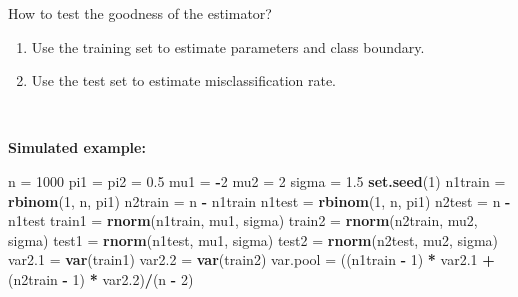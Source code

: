 \documentclass[
  10pt,
  ignorenonframetext,
]{beamer}
\newenvironment{Shaded}{\begin{snugshade}}{\end{snugshade}}
\newcommand{\DecValTok}[1]{\textcolor[rgb]{0.00,0.00,0.81}{#1}}
\newcommand{\FloatTok}[1]{\textcolor[rgb]{0.00,0.00,0.81}{#1}}
\newcommand{\FunctionTok}[1]{\textcolor[rgb]{0.13,0.29,0.53}{\textbf{#1}}}
\newcommand{\NormalTok}[1]{#1}
\newcommand{\OtherTok}[1]{\textcolor[rgb]{0.56,0.35,0.01}{#1}}
\newcommand{\SpecialCharTok}[1]{\textcolor[rgb]{0.81,0.36,0.00}{\textbf{#1}}}
\providecommand{\tightlist}{%
  \setlength{\itemsep}{0pt}\setlength{\parskip}{0pt}}
\begin{document}
\begin{frame}[fragile]
\begin{block}{How to test the goodness of the estimator?}
\protect\hypertarget{how-to-test-the-goodness-of-the-estimator}{}
\(~\)

\begin{enumerate}
\tightlist
\item
  Use the training set to estimate parameters and class boundary.
\item
  Use the test set to estimate misclassification rate.
\end{enumerate}

\(~\)

\textbf{Simulated example:}

\vspace{2mm}

\scriptsize

\begin{Shaded}
\begin{Highlighting}[]
\NormalTok{n }\OtherTok{=} \DecValTok{1000}
\NormalTok{pi1 }\OtherTok{=}\NormalTok{ pi2 }\OtherTok{=} \FloatTok{0.5}
\NormalTok{mu1 }\OtherTok{=} \SpecialCharTok{{-}}\DecValTok{2}
\NormalTok{mu2 }\OtherTok{=} \DecValTok{2}
\NormalTok{sigma }\OtherTok{=} \FloatTok{1.5}
\FunctionTok{set.seed}\NormalTok{(}\DecValTok{1}\NormalTok{)}
\NormalTok{n1train }\OtherTok{=} \FunctionTok{rbinom}\NormalTok{(}\DecValTok{1}\NormalTok{, n, pi1)}
\NormalTok{n2train }\OtherTok{=}\NormalTok{ n }\SpecialCharTok{{-}}\NormalTok{ n1train}
\NormalTok{n1test }\OtherTok{=} \FunctionTok{rbinom}\NormalTok{(}\DecValTok{1}\NormalTok{, n, pi1)}
\NormalTok{n2test }\OtherTok{=}\NormalTok{ n }\SpecialCharTok{{-}}\NormalTok{ n1test}
\NormalTok{train1 }\OtherTok{=} \FunctionTok{rnorm}\NormalTok{(n1train, mu1, sigma)}
\NormalTok{train2 }\OtherTok{=} \FunctionTok{rnorm}\NormalTok{(n2train, mu2, sigma)}
\NormalTok{test1 }\OtherTok{=} \FunctionTok{rnorm}\NormalTok{(n1test, mu1, sigma)}
\NormalTok{test2 }\OtherTok{=} \FunctionTok{rnorm}\NormalTok{(n2test, mu2, sigma)}
\NormalTok{var2}\FloatTok{.1} \OtherTok{=} \FunctionTok{var}\NormalTok{(train1)}
\NormalTok{var2}\FloatTok{.2} \OtherTok{=} \FunctionTok{var}\NormalTok{(train2)}
\NormalTok{var.pool }\OtherTok{=}\NormalTok{ ((n1train }\SpecialCharTok{{-}} \DecValTok{1}\NormalTok{) }\SpecialCharTok{*}\NormalTok{ var2}\FloatTok{.1} \SpecialCharTok{+}\NormalTok{ (n2train }\SpecialCharTok{{-}} \DecValTok{1}\NormalTok{) }\SpecialCharTok{*}\NormalTok{ var2}\FloatTok{.2}\NormalTok{)}\SpecialCharTok{/}\NormalTok{(n }\SpecialCharTok{{-}} \DecValTok{2}\NormalTok{)}
\end{Highlighting}
\end{Shaded}
\end{block}
\end{frame}
\end{document}
